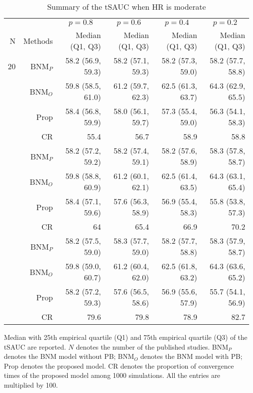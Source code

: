 \begin{table}[!htb]

\caption{\label{tab:sauc.med.2}Summary of the tSAUC when HR is moderate}
\centering
\begin{threeparttable}
\begin{tabular}[t]{rrrrrr}
\toprule
\multicolumn{1}{c}{} & \multicolumn{1}{c}{} & \multicolumn{1}{c}{$p = 0.8$} & \multicolumn{1}{c}{$p = 0.6$} & \multicolumn{1}{c}{$p = 0.4$} & \multicolumn{1}{c}{$p = 0.2$} \\
\cmidrule(l{3pt}r{3pt}){3-3} \cmidrule(l{3pt}r{3pt}){4-4} \cmidrule(l{3pt}r{3pt}){5-5} \cmidrule(l{3pt}r{3pt}){6-6}
N & Methods & Median (Q1, Q3) & Median (Q1, Q3) & Median (Q1, Q3) & Median (Q1, Q3)\\
\midrule
20 & BNM$_P$ & 58.2 (56.9, 59.3) & 58.2 (57.1, 59.3) & 58.2 (57.3, 59.0) & 58.2 (57.7, 58.8)\\
 & BNM$_O$ & 59.8 (58.5, 61.0) & 61.2 (59.7, 62.3) & 62.5 (61.3, 63.7) & 64.3 (62.9, 65.5)\\
 & Prop & 58.4 (56.8, 59.9) & 58.0 (56.1, 59.7) & 57.3 (55.4, 59.0) & 56.3 (54.1, 58.3)\\
 & CR & 55.4 & 56.7 & 58.9 & 58.8\\
\addlinespace
30 & BNM$_P$ & 58.2 (57.2, 59.2) & 58.2 (57.4, 59.1) & 58.2 (57.6, 58.9) & 58.3 (57.8, 58.7)\\
 & BNM$_O$ & 59.8 (58.8, 60.9) & 61.2 (60.1, 62.1) & 62.5 (61.4, 63.5) & 64.3 (63.1, 65.4)\\
 & Prop & 58.4 (57.1, 59.6) & 57.6 (56.3, 58.9) & 56.9 (55.4, 58.3) & 55.8 (53.8, 57.3)\\
 & CR & 64 & 65.4 & 66.9 & 70.2\\
\addlinespace
50 & BNM$_P$ & 58.2 (57.5, 59.0) & 58.3 (57.7, 59.0) & 58.2 (57.7, 58.8) & 58.3 (57.9, 58.7)\\
 & BNM$_O$ & 59.8 (59.0, 60.7) & 61.2 (60.4, 62.0) & 62.5 (61.8, 63.2) & 64.3 (63.6, 65.2)\\
 & Prop & 58.2 (57.2, 59.3) & 57.6 (56.5, 58.6) & 56.9 (55.6, 57.9) & 55.7 (54.1, 56.9)\\
 & CR & 79.6 & 79.8 & 78.9 & 82.7\\
\bottomrule
\end{tabular}
\begin{tablenotes}
\item 
Median with 25th empirical quartile (Q1) and 75th empirical quartile (Q3) of the tSAUC are reported. 
$N$ denotes the number of the published studies. 
BNM$_P$ denotes the BNM model without PB; 
BNM$_O$ denotes the BNM model with PB;
Prop denotes the proposed model.
CR denotes the proportion of convergence times of the proposed model among 1000 simulations.
All the entries are multiplied by 100.
\end{tablenotes}
\end{threeparttable}
\end{table}
